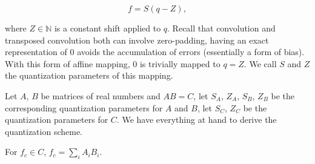 \begin{equation}
 f = S(q - Z),
\end{equation}

where $Z \in \mathbb{N}$ is a constant shift applied to $q$. Recall that convolution and transposed convolution
both can involve zero-padding, having an exact representation of $0$ avoids the accumulation of errors
(essentially a form of bias). With this form of affine mapping, $0$ is trivially mapped to $q = Z$. We call
$S$ and $Z$ the quantization parameters of this mapping.

Let $A$, $B$ be matrices of real numbers and $A B = C$, let $S_A$, $Z_A$, $S_B$, $Z_B$ be the corresponding quantization parameters for $A$ and $B$, let $S_C$, $Z_C$ be the quantization parameters for $C$. We have
everything at hand to derive the quantization scheme.

For $f_c \in C$, $f_c = \sum_{i}^{} A_i B_i$.
\clearpage %
